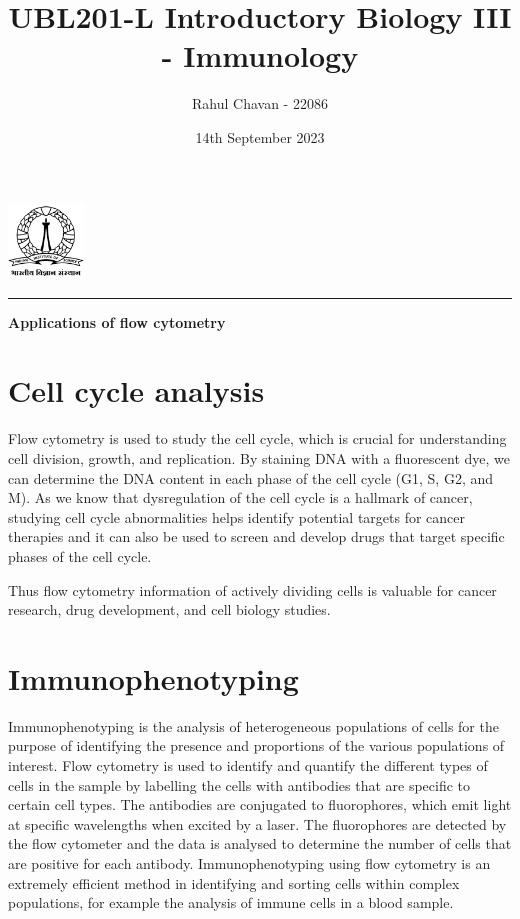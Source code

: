\documentclass{article}
\title{\textbf{UBL201-L Introductory Biology III - Immunology}}
\author{Rahul Chavan - 22086}
\date{14th September 2023}
\renewcommand{\maketitle}{
 \begin{center}
    \includegraphics[width=2cm]{IISc_Master_Seal_Black.jpg}
    \vspace{0.5cm}

    \Large
    \textbf{\thetitle}
    
    \vspace{0.5cm}
    
    \Large
    \theauthor
    
    \vspace{0.2cm}
    
    \large
    \thedate
\vspace{0.2cm}

    \hrule  
    
    
  
  \end{center}
}
\begin{document}
\maketitle
    \begin{center} \Large
        \textbf{Applications of flow cytometry}
    \end{center} 


\textit{{\fontsize{12}{20}\selectfont{Flow cytometry is used to count and analyse the size, shape and properties of individual cells within a heterogeneous population of cells.
Flow cytometry data is extremely quantitative and can be analysed in depth by specific flow cytometry software programs.
Flow cytometry is useful in a wide range of applications, which include:}}}

\section*{Cell cycle analysis}
Flow cytometry is used to study the cell cycle, which is crucial for understanding cell division, growth, and replication.
By staining DNA with a fluorescent dye, we can determine the DNA content in each phase of the cell cycle (G1, S, G2, and M).
As we know that dysregulation of the cell cycle is a hallmark of cancer, studying cell cycle abnormalities helps identify 
potential targets for cancer therapies and it can also be used to screen and develop drugs
that target specific phases of the cell cycle. 

Thus flow cytometry information of actively dividing cells is valuable for cancer research, drug development, and cell biology studies.

\section*{Immunophenotyping}
Immunophenotyping is the analysis of heterogeneous populations of cells for the purpose of 
identifying the presence and proportions of the various populations of interest.
Flow cytometry is used to identify and quantify the different types of cells in the sample
by labelling the cells with antibodies that are specific to certain cell types.
The antibodies are conjugated to fluorophores, which emit light at specific wavelengths when excited by a laser.
The fluorophores are detected by the flow cytometer and the data is analysed to determine the number of cells that are positive for each antibody.
Immunophenotyping using flow cytometry is an extremely efficient method in identifying and sorting cells within complex populations, for example the
analysis of immune cells in a blood sample. 
\end{document}
